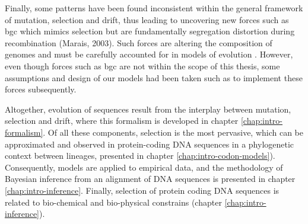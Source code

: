 Finally, some patterns have been found inconsistent within the general framework of mutation, selection and drift, thus leading to uncovering new forces such as \gls{bgc} which mimics selection but are fundamentally segregation distortion during recombination (Marais, 2003).
Such forces are altering the composition of genomes and must be carefully accounted for in models of evolution \citep{Galtier2009, Figuet2014}.
However, even though forces such as \gls{bgc} are not within the scope of this thesis, some assumptions and design of our models had been taken such as to implement these forces subsequently. 

Altogether, evolution of sequences result from the interplay between mutation, selection and drift, where this formalism is developed in chapter \ref{chap:intro-formalism}.
Of all these components, selection is the most pervasive, which can be approximated and observed in protein-coding \acrshort{DNA} sequences in a phylogenetic context between lineages, presented in chapter \ref{chap:intro-codon-models}).
Consequently, models are applied to empirical data, and the methodology of Bayesian inference from an alignment of DNA sequences is presented in chapter \ref{chap:intro-inference}.
Finally, selection of protein coding DNA sequences is related to bio-chemical and bio-physical constrains (chapter \ref{chap:intro-inference}).
